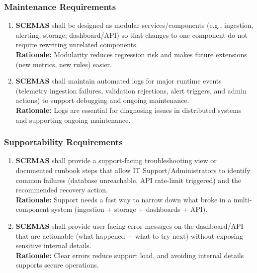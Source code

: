 \documentclass[]{article}
\begin{document}
\subsubsection{Maintenance Requirements}
\label{ssub:maintenance_requirements}
\begin{enumerate}[{MS-M}1. ]
	\item \textbf{SCEMAS} shall be designed as modular services/components (e.g., ingestion, alerting, storage, dashboard/API) so that changes to one component do not require rewriting unrelated components.\\
    \textbf{Rationale:} Modularity reduces regression risk and makes future extensions (new metrics, new rules) easier.
    
	\item \textbf{SCEMAS} shall maintain automated logs for major runtime events (telemetry ingestion failures, validation rejections, alert triggers, and admin actions) to support debugging and ongoing maintenance.\\
    \textbf{Rationale:} Logs are essential for diagnosing issues in distributed systems and supporting ongoing maintenance.
\end{enumerate}

\subsubsection{Supportability Requirements}
\label{ssub:supportability_requirements}
\begin{enumerate}[{MS-S}1. ]
	\item \textbf{SCEMAS} shall provide a support-facing troubleshooting view or documented runbook steps that allow IT Support/Administrators to identify common failures (database unreachable, API rate-limit triggered) and the recommended recovery action.\\
    \textbf{Rationale:} Support needs a fast way to narrow down what broke in a multi-component system (ingestion + storage + dashboards + API).
    
	\item \textbf{SCEMAS} shall provide user-facing error messages on the dashboard/API that are actionable (what happened + what to try next) without exposing sensitive internal details.\\
    \textbf{Rationale:} Clear errors reduce support load, and avoiding internal details supports secure operations.
\end{enumerate}
\end{document}
